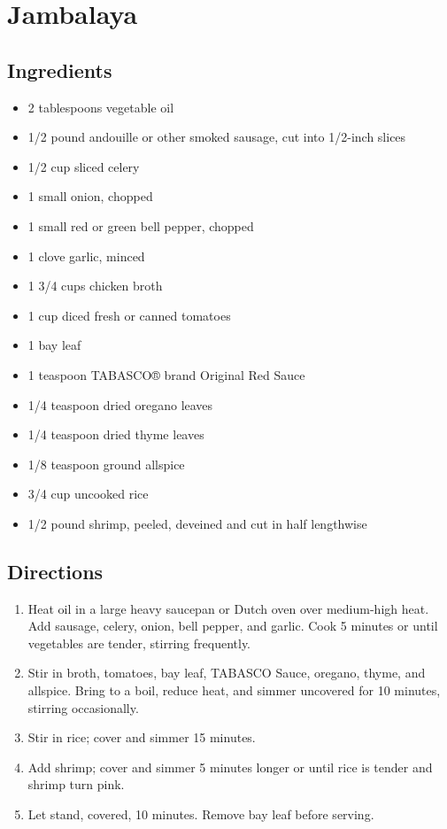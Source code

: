 \documentclass[oneside,11pt]{book}
\newcommand{\Ingredients}[1]{
    \subsection*{Ingredients}
    \begin{itemize} 
        #1 
    \end{itemize}
}
\newcommand{\Directions}[1]{
    \subsection*{Directions}
    \begin{enumerate} 
        #1 
    \end{enumerate}
}
\newcommand{\recipe}[3]{
	\pagebreak
    \section*{ \hspace{-12pt} #1 }
    \addcontentsline{toc}{section}{ \hspace{-6pt} #1 }
	
	\begin{minipage}[t]{0.35\textwidth}
	    #2
	\end{minipage}
	\hspace{0.05\textwidth}
	\begin{minipage}[t]{0.6\textwidth}
	    #3
	\end{minipage}
}
\begin{document}
	\recipe{Jambalaya}{
	    \Ingredients{
			\item 2 tablespoons vegetable oil
			\item 1/2 pound andouille or other smoked sausage, cut into 1/2-inch slices
			\item 1/2 cup sliced celery
			\item 1 small onion, chopped
			\item 1 small red or green bell pepper, chopped
			\item 1 clove garlic, minced
			\item 1 3/4 cups chicken broth
			\item 1 cup diced fresh or canned tomatoes
			\item 1 bay leaf
			\item 1 teaspoon TABASCO® brand Original Red Sauce
			\item 1/4 teaspoon dried oregano leaves
			\item 1/4 teaspoon dried thyme leaves
			\item 1/8 teaspoon ground allspice
			\item 3/4 cup uncooked rice
			\item 1/2 pound shrimp, peeled, deveined and cut in half lengthwise
		}
	}{
		\Directions{
			\item Heat oil in a large heavy saucepan or Dutch oven over medium-high heat. 
				Add sausage, celery, onion, bell pepper, and garlic. 
				Cook 5 minutes or until vegetables are tender, stirring frequently.
			\item Stir in broth, tomatoes, bay leaf, TABASCO Sauce, oregano, thyme, and allspice. 
				Bring to a boil, reduce heat, and simmer uncovered for 10 minutes, stirring occasionally. 
			\item Stir in rice; cover and simmer 15 minutes. 
			\item Add shrimp; cover and simmer 5 minutes longer or until rice is tender and shrimp turn pink. 
			\item Let stand, covered, 10 minutes. 
				Remove bay leaf before serving.
		}
	}
    
\end{document}

